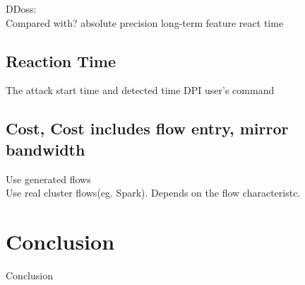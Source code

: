 \documentclass{acm_proc_article-sp}
\begin{document}
DDoss:\\
Compared with?
absolute precision
long-term feature
react time

\subsection{Reaction Time}
The attack start time and detected time
DPI
user's command

\subsection{Cost, Cost includes flow entry, mirror bandwidth}
Use generated flows\\
Use real cluster flows(eg. Spark). Depends on the flow characteristc.


\section{Conclusion}
Conclusion\\




\end{document}
